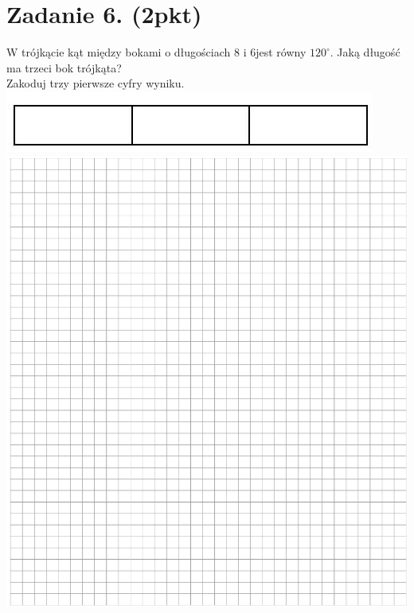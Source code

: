 \documentclass[10pt]{article}
\begin{document}
\section*{Zadanie 6. (2pkt)}
W trójkącie kąt między bokami o długościach 8 i 6jest równy \(120^{\circ}\). Jaką długość ma trzeci bok trójkąta?\\
Zakoduj trzy pierwsze cyfry wyniku.\\
\includegraphics[max width=\textwidth, center]{2024_11_21_caad0d2d07cc5c30818fg-04}\\
\includegraphics[max width=\textwidth, center]{2024_11_21_caad0d2d07cc5c30818fg-04(1)}
\end{document}
